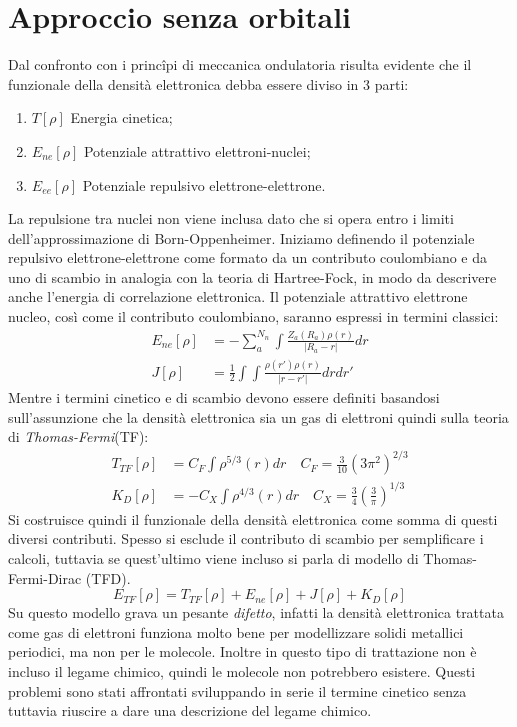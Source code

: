 \documentclass[oneside]{amsbook}
\numberwithin{section}{chapter}
\numberwithin{equation}{section}
\numberwithin{figure}{section}
\begin{document}
\section{Approccio senza orbitali}
Dal confronto con i princ\^ipi di meccanica ondulatoria risulta evidente che il funzionale della densità elettronica debba essere diviso in $3$ parti:
\begin{enumerate}
\item $T[\rho]$ Energia cinetica;
\item $E_{ne}[\rho]$ Potenziale attrattivo elettroni-nuclei;
\item $E_{ee}[\rho]$ Potenziale repulsivo elettrone-elettrone.
\end{enumerate}
La repulsione tra nuclei non viene inclusa dato che si opera entro i limiti dell'approssimazione di Born-Oppenheimer.
Iniziamo definendo il potenziale repulsivo elettrone-elettrone come formato da un contributo coulombiano e da uno di scambio in analogia con la teoria di Hartree-Fock, in modo da descrivere anche l'energia di correlazione elettronica.  Il potenziale attrattivo elettrone nucleo, così come il contributo coulombiano, saranno  espressi in termini classici:
\begin{equation}
\begin{aligned}
E_{ne}[\rho] &= - \sum \limits_a ^{N_n} \int \frac{Z_a(R_a)\rho(r)}{\vert R_a-r \vert}dr\\
J[\rho] &= \frac{1}{2} \int \int \frac{\rho(r')\rho(r)}{\vert r-r' \vert}dr dr'
\end{aligned}
\end{equation}
Mentre i termini cinetico e di scambio devono essere definiti basandosi sull'assunzione che la densità elettronica sia un gas di elettroni quindi sulla teoria di \emph{Thomas-Fermi}(TF): 
\begin{equation}
\begin{aligned}
T_{TF}[\rho]&= C_F \int \rho^{5/3}(r)dr \quad C_F=\frac{3}{10} (3\pi^2)^{2/3} \\
K_{D}[\rho]&= -C_X \int \rho^{4/3}(r)dr \quad C_X=\frac{3}{4} \left( \frac{3}{\pi}\right)^{1/3}
\end{aligned}
\end{equation}
Si costruisce quindi il funzionale della densità elettronica come somma di questi diversi contributi. Spesso si esclude il contributo di scambio per semplificare i calcoli, tuttavia se quest'ultimo viene incluso si parla di modello di Thomas-Fermi-Dirac (TFD).
\begin{equation}
E_{TF}[\rho]= T_{TF}[\rho]  + E_{ne}[\rho] +J[\rho]+ K_D[\rho]
\end{equation}
Su questo modello grava un pesante \emph{difetto}, infatti la densità elettronica trattata come gas di elettroni funziona molto bene per modellizzare solidi metallici periodici, ma non per le molecole. Inoltre in questo tipo di trattazione non è incluso il legame chimico, quindi le molecole non potrebbero esistere. Questi problemi sono stati affrontati sviluppando in serie il termine cinetico senza tuttavia riuscire a dare una descrizione del legame chimico.
\end{document}
